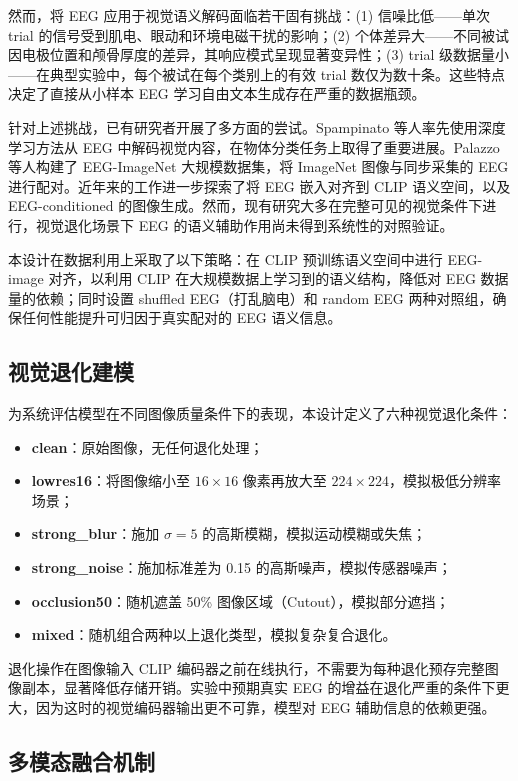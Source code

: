 然而，将 EEG 应用于视觉语义解码面临若干固有挑战：(1) 信噪比低——单次 trial 的信号受到肌电、眼动和环境电磁干扰的影响；(2) 个体差异大——不同被试因电极位置和颅骨厚度的差异，其响应模式呈现显著变异性；(3) trial 级数据量小——在典型实验中，每个被试在每个类别上的有效 trial 数仅为数十条。这些特点决定了直接从小样本 EEG 学习自由文本生成存在严重的数据瓶颈。

针对上述挑战，已有研究者开展了多方面的尝试。Spampinato 等人率先使用深度学习方法从 EEG 中解码视觉内容，在物体分类任务上取得了重要进展。Palazzo 等人构建了 EEG-ImageNet 大规模数据集，将 ImageNet 图像与同步采集的 EEG 进行配对。近年来的工作进一步探索了将 EEG 嵌入对齐到 CLIP 语义空间，以及 EEG-conditioned 的图像生成。然而，现有研究大多在完整可见的视觉条件下进行，视觉退化场景下 EEG 的语义辅助作用尚未得到系统性的对照验证。

本设计在数据利用上采取了以下策略：在 CLIP 预训练语义空间中进行 EEG-image 对齐，以利用 CLIP 在大规模数据上学习到的语义结构，降低对 EEG 数据量的依赖；同时设置 shuffled EEG（打乱脑电）和 random EEG 两种对照组，确保任何性能提升可归因于真实配对的 EEG 语义信息。

\subsection{视觉退化建模}

为系统评估模型在不同图像质量条件下的表现，本设计定义了六种视觉退化条件：

\begin{itemize}
  \item \textbf{clean}：原始图像，无任何退化处理；
  \item \textbf{lowres16}：将图像缩小至 $16\times16$ 像素再放大至 $224\times224$，模拟极低分辨率场景；
  \item \textbf{strong\_blur}：施加 $\sigma=5$ 的高斯模糊，模拟运动模糊或失焦；
  \item \textbf{strong\_noise}：施加标准差为 0.15 的高斯噪声，模拟传感器噪声；
  \item \textbf{occlusion50}：随机遮盖 50\% 图像区域（Cutout），模拟部分遮挡；
  \item \textbf{mixed}：随机组合两种以上退化类型，模拟复杂复合退化。
\end{itemize}

退化操作在图像输入 CLIP 编码器之前在线执行，不需要为每种退化预存完整图像副本，显著降低存储开销。实验中预期真实 EEG 的增益在退化严重的条件下更大，因为这时的视觉编码器输出更不可靠，模型对 EEG 辅助信息的依赖更强。

\subsection{多模态融合机制}

